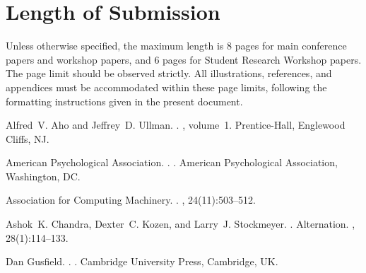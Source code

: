 \documentclass[11pt]{article}
\begin{document}
\section{Length of Submission}
\label{sec:length}

Unless otherwise specified, the maximum length is $8$ pages
for main conference papers and workshop papers, and
$6$ pages for Student Research Workshop papers. The page limit
should be observed strictly. All illustrations, references, and
appendices must be accommodated within these page limits, following
the formatting instructions given in the present document.


%
%

\begin{thebibliography}{}

Alfred~V. Aho and Jeffrey~D. Ullman.
.
, volume~1.
\newblock Prentice-{Hall}, Englewood Cliffs, NJ.

{American Psychological Association}.
.
.
\newblock American Psychological Association, Washington, DC.

{Association for Computing Machinery}.
.
, 24(11):503--512.

Ashok~K. Chandra, Dexter~C. Kozen, and Larry~J. Stockmeyer.
.
\newblock Alternation.
,
  28(1):114--133.

Dan Gusfield.
.
.
\newblock Cambridge University Press, Cambridge, UK.

\end{thebibliography}
\end{document}
